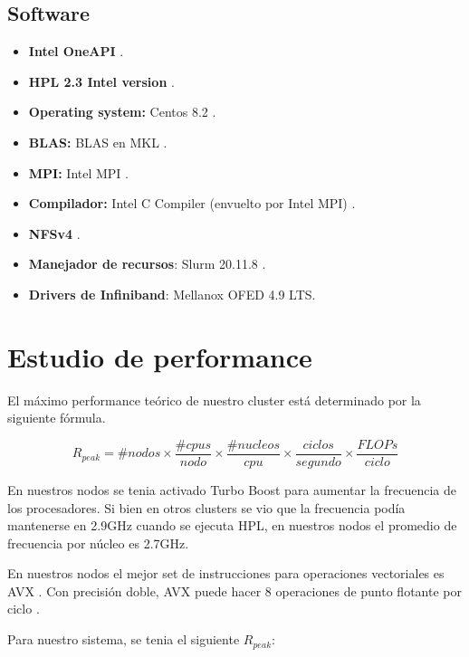 \documentclass[conference,compsoc]{IEEEtran}
\begin{document}
\subsection{Software}\label{OurOwnCluster:SoftwareEnvironment}

\begin{itemize}
    \item \textbf{Intel OneAPI} \cite{intel-oneapi}.
	\item \textbf{HPL 2.3 Intel version} \cite{intel-hplversion}.	
	\item \textbf{Operating system:} Centos 8.2 \cite{centos}.
	\item \textbf{BLAS:} BLAS en MKL \cite{intel-mkl-blas}.
	\item \textbf{MPI:} Intel MPI \cite{intel-mpi}.
\item \textbf{Compilador:} Intel C Compiler (envuelto por Intel MPI) \cite{intel-compiler}.
	\item \textbf{NFSv4} \cite{nfs-tutorial}.
	\item \textbf{Manejador de recursos}: Slurm 20.11.8 \cite{slurm20-11-8}.
	\item \textbf{Drivers de Infiniband}: Mellanox OFED 4.9 LTS.
\end{itemize}

\section{Estudio de performance}

El máximo performance teórico de nuestro cluster está determinado por la siguiente fórmula. 

\begin{equation} \label{eq:1}
	R_{peak} = \#nodos \times \frac{\#cpus}{nodo} \times \frac{\#nucleos}{cpu} \times \frac{ciclos}{segundo} \times \frac{FLOPs}{ciclo} 
\end{equation}

En nuestros nodos se tenia activado Turbo Boost para aumentar la frecuencia de los procesadores. Si bien en otros clusters se vio que la frecuencia podía mantenerse en 2.9GHz cuando se ejecuta HPL, en nuestros nodos el promedio de frecuencia por núcleo es 2.7GHz.

En nuestros nodos el mejor set de instrucciones para operaciones vectoriales es AVX \cite{intel-avx}. Con precisión doble, AVX puede hacer 8 operaciones de punto flotante por ciclo \cite{wikichip-flops}.

Para nuestro sistema, se tenia el siguiente $R_{peak}$:
\end{document}
